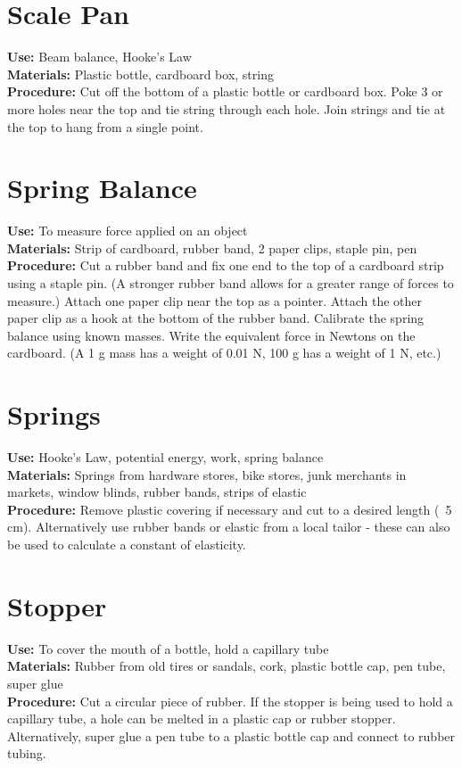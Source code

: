 \section*{Scale Pan}
\label{sec:scale-pan}
\vspace{-10pt}
\textbf{Use:} Beam balance, Hooke's Law\\
\textbf{Materials:} Plastic bottle, cardboard box, string\\
\textbf{Procedure:} Cut off the bottom of a plastic bottle or cardboard box. Poke 3 or more holes near the top and tie string through each hole. Join strings and tie at the top to hang from a single point.

\section*{Spring Balance}
\label{sec:spring-balance}
\textbf{Use:} To measure force applied on an object\\
\textbf{Materials:} Strip of cardboard, rubber band, 2 paper clips, staple pin, pen\\
\textbf{Procedure:} Cut a rubber band and fix one end to the top of a cardboard strip using a staple pin. (A stronger rubber band allows for a greater range of forces to measure.) Attach one paper clip near the top as a pointer. Attach the other paper clip as a hook at the bottom of the rubber band. Calibrate the spring balance using known masses. Write the equivalent force in Newtons on the cardboard. (A 1 g mass has a weight of 0.01 N, 100 g has a weight of 1 N, etc.)

\section*{Springs}
\vspace{-10pt}
\textbf{Use:} Hooke's Law, potential energy, work, spring balance\\
\textbf{Materials:} Springs from hardware stores, bike stores, junk merchants in markets, window blinds, rubber bands, strips of elastic\\
\textbf{Procedure:} Remove plastic covering if necessary and cut to a desired length (~5 cm). Alternatively use rubber bands or elastic from a local tailor - these can also be used to calculate a constant of elasticity.

\section*{Stopper}
\vspace{-10pt}
\textbf{Use:} To cover the mouth of a bottle, hold a capillary tube\\
\textbf{Materials:} Rubber from old tires or sandals, cork, plastic bottle cap, pen tube, super glue\\
\textbf{Procedure:} Cut a circular piece of rubber.  If the stopper is being used to hold a capillary tube, a hole can be melted in a plastic cap or rubber stopper. Alternatively, super glue a pen tube to a plastic bottle cap and connect to rubber tubing.

